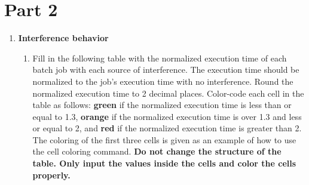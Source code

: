 \section*{Part 2}

\begin{enumerate}
 
    \item \textbf{Interference behavior}
    \begin{enumerate}


        \item Fill in the following table with the normalized execution time of each batch job with each source of interference. The execution time should be normalized to the job’s execution time with no interference. Round the normalized execution time to 2 decimal places. Color-code each cell in the table as follows: {\color{Green}\textbf{green}} if the normalized execution time is less than or equal to 1.3, {\color{YellowOrange}\textbf{orange}} if the normalized execution time is over 1.3 and less or equal to 2, and {\color{Red}\textbf{red}} if the normalized execution time is greater than 2. The coloring of the first three cells is given as an example of how to use the cell coloring command.   \textbf{{\color{red}Do not change the structure of the table. Only input the values inside the cells and color the cells properly.}} 


\end{enumerate}
\end{enumerate}
